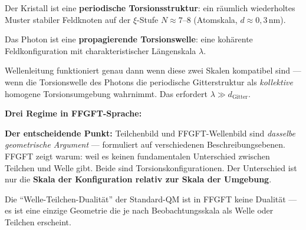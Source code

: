 \begin{foundation}

Der Kristall ist eine \textbf{periodische Torsionsstruktur}:
ein räumlich wiederholtes Muster stabiler Feldknoten
auf der $\xi$-Stufe $N \approx 7$--8 (Atomskala, $d \approx 0{,}3$\,nm).

Das Photon ist eine \textbf{propagierende Torsionswelle}:
eine kohärente Feldkonfiguration mit charakteristischer
Längenskala $\lambda$.

Wellenleitung funktioniert genau dann wenn diese
zwei Skalen kompatibel sind --- wenn die Torsionswelle
des Photons die periodische Gitterstruktur als
\emph{kollektive} homogene Torsionsumgebung wahrnimmt.
Das erfordert $\lambda \gg d_\text{Gitter}$.

\medskip
\textbf{Drei Regime in FFGFT-Sprache:}

\begin{center}
\end{center}

\medskip
\textbf{Der entscheidende Punkt:}
Teilchenbild und FFGFT-Wellenbild sind
\emph{dasselbe geometrische Argument} ---
formuliert auf verschiedenen Beschreibungsebenen.
FFGFT zeigt warum: weil es keinen fundamentalen
Unterschied zwischen Teilchen und Welle gibt.
Beide sind Torsionskonfigurationen.
Der Unterschied ist nur die \textbf{Skala der Konfiguration
relativ zur Skala der Umgebung}.

Die ``Welle-Teilchen-Dualität'' der Standard-QM
ist in FFGFT keine Dualität --- es ist eine einzige
Geometrie die je nach Beobachtungsskala
als Welle oder Teilchen erscheint.
\end{foundation}

